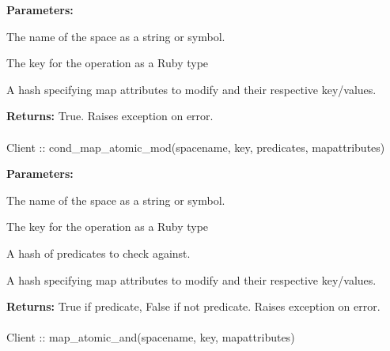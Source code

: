 \noindent\textbf{Parameters:}
\begin{description}[labelindent=\widthof{{\code{mapattributes}}},leftmargin=*,noitemsep,nolistsep,align=right]
\item[\code{spacename}] The name of the space as a string or symbol.
\item[\code{key}] The key for the operation as a Ruby type
\item[\code{mapattributes}] A hash specifying map attributes to modify and their respective key/values.
\end{description}

\noindent\textbf{Returns:}
True.  Raises exception on error.

\paragraph{}
\label{api:ruby:cond_map_atomic_mod}
\begin{ccode}
Client :: cond_map_atomic_mod(spacename, key, predicates, mapattributes)
\end{ccode}
\funcdesc 

\noindent\textbf{Parameters:}
\begin{description}[labelindent=\widthof{{\code{mapattributes}}},leftmargin=*,noitemsep,nolistsep,align=right]
\item[\code{spacename}] The name of the space as a string or symbol.
\item[\code{key}] The key for the operation as a Ruby type
\item[\code{predicates}] A hash of predicates to check against.
\item[\code{mapattributes}] A hash specifying map attributes to modify and their respective key/values.
\end{description}

\noindent\textbf{Returns:}
True if predicate, False if not predicate.  Raises exception on error.

\paragraph{}
\label{api:ruby:map_atomic_and}
\begin{ccode}
Client :: map_atomic_and(spacename, key, mapattributes)
\end{ccode}
\funcdesc 

